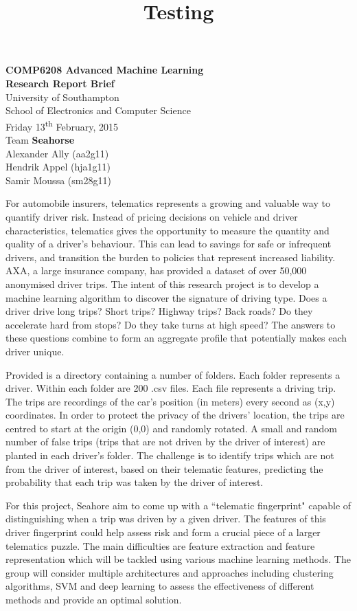 \documentclass[11pt, a4paper, titlepage]{article}
\title{Testing}
\begin{document}
\begin{center}
{\Large \textbf{COMP6208 Advanced Machine Learning\\Research Report Brief}}\\
\vspace{0.7cm}
University of Southampton\\
School of Electronics and Computer Science\\
Friday 13\textsuperscript{th} February, 2015\\
\vspace{0.7cm}
Team \textbf{{\large Seahorse}}\\
Alexander Ally (aa2g11)\\
Hendrik Appel (hja1g11)\\
Samir Moussa (sm28g11)
\end{center}

For automobile insurers, telematics represents a growing and valuable way to quantify driver risk. Instead of pricing decisions on vehicle and driver characteristics, telematics gives the opportunity to measure the quantity and quality of a driver's behaviour. This can lead to savings for safe or infrequent drivers, and transition the burden to policies that represent increased liability. AXA, a large insurance company, has provided a dataset of over 50,000 anonymised driver trips. The intent of this research project is to develop a machine learning algorithm to discover the signature of driving type. Does a driver drive long trips? Short trips? Highway trips? Back roads? Do they accelerate hard from stops? Do they take turns at high speed? The answers to these questions combine to form an aggregate profile that potentially makes each driver unique.

Provided is a directory containing a number of folders. Each folder represents a driver. Within each folder are 200 .csv files. Each file represents a driving trip. The trips are recordings of the car's position (in meters) every second as (x,y) coordinates. In order to protect the privacy of the drivers' location, the trips are centred to start at the origin (0,0) and randomly rotated. A small and random number of false trips (trips that are not driven by the driver of interest) are planted in each driver's folder. The challenge is to identify trips which are not from the driver of interest, based on their telematic features, predicting the probability that each trip was taken by the driver of interest.

For this project, Seahore aim to come up with a ``telematic fingerprint" capable of distinguishing when a trip was driven by a given driver. The features of this driver fingerprint could help assess risk and form a crucial piece of a larger telematics puzzle. The main difficulties are feature extraction and feature representation which will be tackled using various machine learning methods. The group will consider multiple architectures and approaches including clustering algorithms, SVM and deep learning to assess the effectiveness of different methods and provide an optimal solution.
\end{document}
